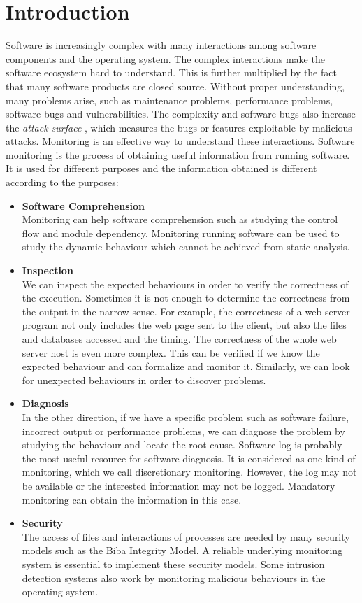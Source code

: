 \chapter{Introduction}

Software is increasingly complex with many interactions among
software components and the operating system.
The complex interactions make the software ecosystem hard to understand.
This is further multiplied by the fact that many software products are
closed source.
Without proper understanding, many problems arise, such as
maintenance problems, performance problems, software bugs and vulnerabilities.
The complexity and software bugs also increase the
{\em attack surface} \cite{manadhata2006attack},
which measures the bugs or features exploitable by malicious attacks.
Monitoring is an effective way to understand these interactions.
Software monitoring is the process of obtaining useful information
from running software.
It is used for different purposes and the information obtained is different
according to the purposes:

\begin{itemize}
\item {\bf Software Comprehension} \\
Monitoring can help software comprehension such as studying the control
flow and module dependency.
Monitoring running software can be used to study the dynamic behaviour which
cannot be achieved from static analysis.
\item {\bf Inspection} \\
We can inspect the expected behaviours in order to
verify the correctness of the execution.
Sometimes it is not enough to determine the correctness from the output in
the narrow sense.
For example, the correctness of a web server program not only includes
the web page sent to the client,
but also the files and databases accessed and the timing.
The correctness of the whole web server host is even more complex.
This can be verified if we know the expected behaviour and
can formalize and monitor it.
Similarly, we can look for unexpected behaviours in order to discover problems.
\item {\bf Diagnosis} \\
In the other direction, if we have a specific problem such as software failure,
incorrect output or performance problems, we can diagnose the problem by
studying the behaviour and locate the root cause.
Software log is probably the most useful resource for software diagnosis.
It is considered as one kind of monitoring,
which we call discretionary monitoring.
However, the log may not be available or the interested information
may not be logged.
Mandatory monitoring can obtain the information in this case.
\item {\bf Security} \\
The access of files and interactions of processes are needed by many
security models such as the Biba Integrity Model.
A reliable underlying monitoring system is essential to implement
these security models.
Some intrusion detection systems also work by monitoring malicious
behaviours in the operating system.
\end{itemize}

